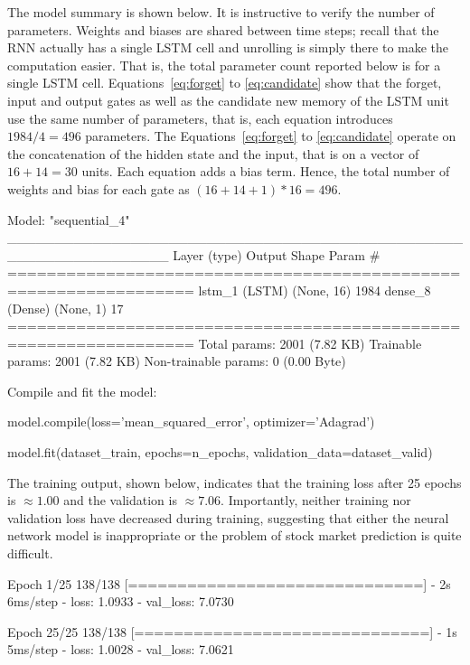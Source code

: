 The model summary is shown below. It is instructive to verify the number of parameters. Weights and biases are shared between time steps; recall that the RNN actually has a single LSTM cell and unrolling is simply there to make the computation easier. That is, the total parameter count reported below is for a single LSTM cell. Equations~\ref{eq:forget} to \ref{eq:candidate} show that the forget, input and output gates as well as the candidate new memory of the LSTM unit use the same number of parameters, that is, each equation introduces $1984/4 = 496$ parameters. The Equations~\ref{eq:forget} to \ref{eq:candidate} operate on the concatenation of the hidden state and the input, that is on a vector of $16 + 14 = 30$ units. Each equation adds a bias term. Hence, the total number of weights and bias for each gate as $(16 + 14 + 1) * 16 = 496$.

\begin{samepage}
\begin{textcode}
Model: "sequential_4"
_________________________________________________________________
 Layer (type)                Output Shape              Param #   
=================================================================
 lstm_1 (LSTM)               (None, 16)                1984      
 dense_8 (Dense)             (None, 1)                 17        
=================================================================
Total params: 2001 (7.82 KB)
Trainable params: 2001 (7.82 KB)
Non-trainable params: 0 (0.00 Byte)
\end{textcode}
\end{samepage}

Compile and fit the model:
\begin{samepage}
\begin{pythoncode}
model.compile(loss='mean_squared_error', optimizer='Adagrad')

model.fit(dataset_train, epochs=n_epochs,
          validation_data=dataset_valid)
\end{pythoncode}
\end{samepage}
The training output, shown below, indicates that the training loss after 25 epochs is $\approx 1.00$ and the validation is $\approx 7.06$. Importantly, neither training nor validation loss have decreased during training, suggesting that either the neural network model is inappropriate or the problem of stock market prediction is quite difficult.

\begin{textcode}
Epoch 1/25
138/138 [==============================] - 2s 6ms/step -
 loss: 1.0933 - val_loss: 7.0730

Epoch 25/25
138/138 [==============================] - 1s 5ms/step -
 loss: 1.0028 - val_loss: 7.0621
\end{textcode}

